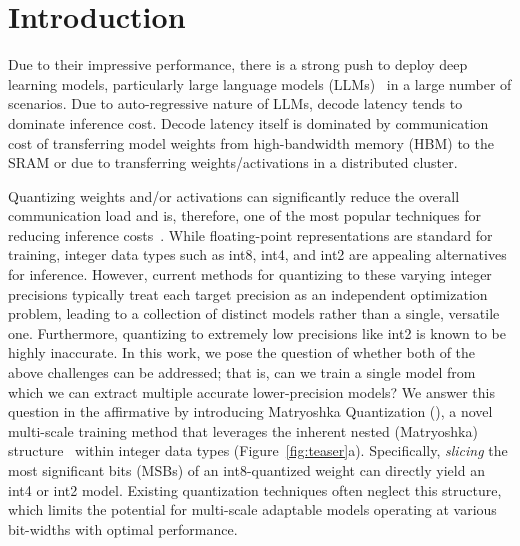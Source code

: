 \section{Introduction}
\label{sec:intro}

Due to their impressive performance, there is a strong push to deploy deep learning models, particularly large language models (LLMs)~\citep{team2024gemini,dubey2024llama,achiam2023gpt} in a large number of scenarios. Due to auto-regressive nature of LLMs, decode latency tends to dominate inference cost. Decode latency itself is dominated by communication cost of transferring model weights from high-bandwidth memory (HBM) to the SRAM or due to transferring weights/activations in a distributed cluster. 


Quantizing weights and/or activations can significantly reduce the overall communication load and is, therefore, one of the most popular techniques for reducing inference costs~\citep{dettmers2022gpt3}. While floating-point representations are standard for training, integer data types such as int8, int4, and int2 are appealing alternatives for inference. However, current methods for quantizing to these varying integer precisions typically treat each target precision as an independent optimization problem, leading to a collection of distinct models rather than a single, versatile one. Furthermore, quantizing to extremely low precisions like int2 is known to be highly inaccurate. In this work, we pose the question of whether both of the above challenges can be addressed; that is, can we train a single model from which we can extract multiple accurate lower-precision models? We answer this question in the affirmative by introducing Matryoshka Quantization (\alg), a novel multi-scale training method that leverages the inherent nested (Matryoshka) structure~\citep{kusupati2022matryoshka} within integer data types (Figure~\ref{fig:teaser}a). Specifically, \textit{slicing} the most significant bits (MSBs) of an int8-quantized weight can directly yield an int4 or int2 model. Existing quantization techniques often neglect this structure, which limits the potential for multi-scale adaptable models operating at various bit-widths with optimal performance.

